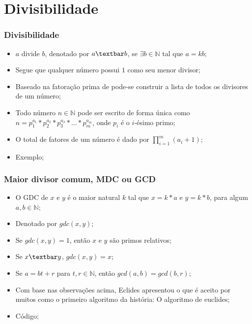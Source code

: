 \documentclass{beamer}
\begin{document}


\section{Divisibilidade}
\begin{frame}
    \frametitle{Divisibilidade}

    \begin{itemize}
        \item $a$ divide $b$, denotado por $a \textbar b$, se $\exists b \in \mathbb{N}$ tal que $a = kb$;
        \item Segue que qualquer número possui $1$ como seu menor divisor;
        \item Baseado na fatoração prima de pode-se construir a lista de todos os divisores de um número;
        \item Todo número $n \in \mathbb{N}$ pode ser escrito de forma única como $n = p_1^{a_1} *p_2^{a_2} * p_3^{a_3} * \ldots * p_m^{a_m}$, onde $p_i$ é o $i$-ésimo primo;
        \item O total de fatores de um número é dado por $\prod_{i = 1}^m (a_i + 1)$;
        \item Exemplo;
    \end{itemize}
\end{frame}

\begin{frame}
    \frametitle{Maior divisor comum, MDC ou GCD}

    \begin{itemize}
        \item O GDC de $x$ e $y$ é o maior natural $k$ tal que $x=k*a$ e $y=k*b$, para algum $a,b \in \mathbb{N}$;
        \item Denotado por $gdc(x, y)$;
        \item Se $gdc(x, y) = 1$, então $x$ e $y$ são primos relativos;
        \item Se $x \textbar y$, $gdc(x, y) = x$;
        \item Se $a = bt + r$ para $t,r \in \mathbb{N}$, então $gcd(a, b) = gcd(b, r)$;
        \item Com base nas observações acima, Eclides apresentou o que é aceito por muitos como o primeiro algoritmo da história: O algoritmo de euclides;
        \item Código;
    \end{itemize}
\end{frame}
\end{document}
